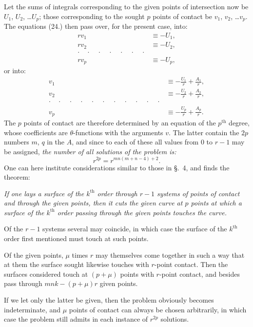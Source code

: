 \documentclass{article}
\begin{document}
Let the sums of integrals corresponding to the given points of intersection now be $U_{1}$, $U_{2}$, \ldots $U_{p}$; those corresponding to the sought $p$ points of contact be $v_{1}$, $v_{2}$, \ldots $v_{p}$. The equations (24.) then pass over, for the present case, into:
\[
\begin{aligned}
rv_{1} &\equiv -U_{1},\\
rv_{2} &\equiv -U_{2},\\
\cdot\quad\cdot\quad\cdot\quad\cdot\quad\cdot\quad\cdot\quad\cdot &\\
rv_{p} &\equiv -U_{p},
\end{aligned}
\]
or into:
\[
\begin{aligned}
v_{1} &\equiv -\frac{U_{1}}{r}+\frac{A_{1}}{r},\\
v_{2} &\equiv -\frac{U_{2}}{r}+\frac{A_{2}}{r},\\
\cdot\quad\cdot\quad\cdot\quad\cdot\quad\cdot\quad\cdot\quad\cdot\quad\cdot\quad\cdot\quad\cdot\quad\cdot &\\
v_{p} &\equiv -\frac{U_{p}}{r}+\frac{A_{p}}{r}.
\end{aligned}
\]
The $p$ points of contact are therefore determined by an equation of the $p^{\text{th}}$ degree, whose coefficients are $\theta$-functions with the arguments $v$. The latter contain the $2p$ numbers $m$, $q$ in the $A$, and since to each of these all values from 0 to $r-1$ may be assigned, \emph{the number of all solutions of the problem is:}
\[
r^{2p} = r^{mn(m+n-4)+2}.
\]
One can here institute considerations similar to those in §.~4, and finds the theorem:

\emph{If one lays a surface of the $k^{\text{th}}$ order through $r-1$ systems of points of contact and through the given points, then it cuts the given curve at $p$ points at which a surface of the $k^{\text{th}}$ order passing through the given points touches the curve.}


Of the $r-1$ systems several may coincide, in which case the surface of the $k^{\text{th}}$ order first mentioned must touch at such points.

Of the given points, $\mu$ times $r$ may themselves come together in such a way that at them the surface sought likewise touches with $r$-point contact. Then the surfaces considered touch at $(p+\mu)$ points with $r$-point contact, and besides pass through $mnk-(p+\mu)r$ given points.

If we let only the latter be given, then the problem obviously becomes indeterminate, and $\mu$ points of contact can always be chosen arbitrarily, in which case the problem still admits in each instance of $r^{2p}$ solutions.
\end{document}

